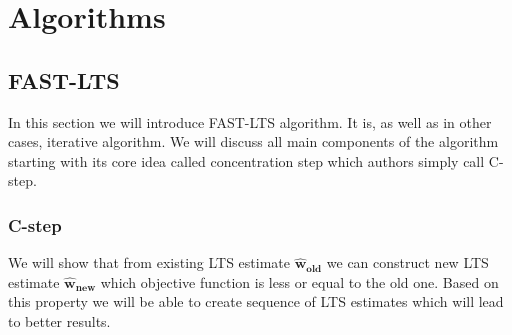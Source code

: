 \chapter{Algorithms}

\newcommand{\paramhat}[1]{\boldsymbol{\hat{\textbf{#1}}}}
\newcommand{\param}[1]{\textbf{\text{#1}}}
\newcommand\numberthis{\addtocounter{equation}{1}\tag{\theequation}}
\newcommand{\showVec}[3]{\vec{#1} = (\lowercase{#2}_1, \lowercase{#2}_2,\ldots,\lowercase{#2}_#3)}
\newcommand{\m}[1]{\boldsymbol{\uppercase{#1}}}

\let\vec\boldsymbol



\section{FAST-LTS}
In this section we will introduce FAST-LTS algorithm\cite{rouss:2000}. 
It is, as well as in other cases, iterative algorithm. We will discuss all main components
of the algorithm starting with its core idea called concentration step which 
authors simply call C-step.


\subsection{C-step}
We will show that from existing LTS estimate $\boldsymbol{\hat{w}_{old}}$ we 
can construct new LTS estimate $\boldsymbol{\hat{w}_{new}}$ which objective 
function is less or equal to the old one. Based on this property we will be able 
to create sequence of LTS estimates which will lead to better results.


\newcommand{\what}[1]{
	\vec{\hat{w}_#1}
}
\newcommand{\whatn}{
	\vec{\hat{w}}
}

